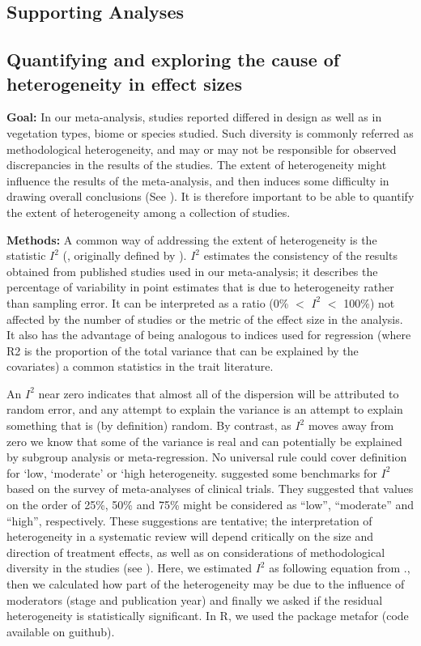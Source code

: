 \documentclass[a4paper,11pt]{article}
\begin{document}
\begin{appendices}
\clearpage
\section{Supporting Analyses}\label{app:supp_info_analyses}
\subsection{Quantifying and exploring the cause of heterogeneity in effect sizes}

\textbf{Goal:} In our meta-analysis, studies reported differed in design as well as in vegetation types, biome or species studied. Such diversity is commonly referred as methodological heterogeneity, and may or may not be responsible for observed discrepancies in the results of the studies. The extent of heterogeneity might influence the results of the meta-analysis, and then induces some difficulty in drawing overall conclusions (See \citealt{Higgins:2002iq}). It is therefore important to be able to quantify the extent of heterogeneity among a collection of studies.

\textbf{Methods:} A common way of addressing the extent of heterogeneity is the statistic $I^{2}$ (\citealt{Santos:2012gt}, originally defined by \citealt{Higgins:2002iq}). $I^{2}$ estimates the consistency of the results obtained from published studies used in our meta-analysis; it describes the percentage of variability in point estimates that is due to heterogeneity rather than sampling error. It can be interpreted as a ratio (0\% $<$ $I^{2}$ $<$ 100\%) not affected by the number of studies or the metric of the effect size in the analysis. It also has the advantage of being analogous to indices used for regression (where R2 is the proportion of the total variance that can be explained by the covariates) a common statistics in the trait literature.

An $I^{2}$ near zero indicates that almost all of the dispersion will be attributed to random error, and any attempt to explain the variance is an attempt to explain something that is (by definition) random. By contrast, as $I^{2}$ moves away from zero we know that some of the variance is real and can potentially be explained by subgroup analysis or meta-regression.
No universal rule could cover definition for ‘low, ‘moderate’ or ‘high heterogeneity. \citealt{Higgins:2003hz} suggested some benchmarks for $I^{2}$ based on the survey of meta-analyses of clinical trials. They suggested that values on the order of 25\%, 50\% and 75\% might be considered as ``low'', ``moderate'' and ``high'', respectively. These suggestions are tentative; the interpretation of heterogeneity in a systematic review will depend critically on the size and direction of treatment effects, as well as on considerations of methodological diversity in the studies (see \citealt{Borenstein:2009um}).
Here, we estimated $I^{2}$ as following equation from \citealt{Higgins:2002iq}., then we calculated how part of the heterogeneity may be due to the influence of moderators (stage and publication year) and finally we asked if the residual heterogeneity is statistically significant. In R, we used the package metafor (code available on guithub).



\end{appendices}
\end{document}
